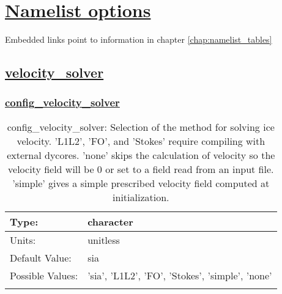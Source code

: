 \chapter[Namelist options]{\hyperref[chap:namelist_tables]{Namelist options}}
\label{chap:namelist_sections}
Embedded links point to information in chapter \ref{chap:namelist_tables}
\section[velocity\_solver]{\hyperref[sec:nm_tab_velocity_solver]{velocity\_solver}}
\label{sec:nm_sec_velocity_solver}
\subsection[config\_velocity\_solver]{\hyperref[sec:nm_tab_velocity_solver]{config\_velocity\_solver}}
\label{subsec:nm_sec_config_velocity_solver}
\begin{center}
\begin{longtable}{| p{2.0in} || p{4.0in} |}
    \hline
    Type: & character \\
    \hline
    Units: & \si{unitless} \\
    \hline
    Default Value: & sia \\
    \hline
    Possible Values: & 'sia', 'L1L2', 'FO', 'Stokes', 'simple', 'none' \\
    \hline
    \caption{config\_velocity\_solver: Selection of the method for solving ice velocity. 'L1L2', 'FO', and 'Stokes' require compiling with external dycores. 'none' skips the calculation of velocity so the velocity field will be 0 or set to a field read from an input file.  'simple' gives a simple prescribed velocity field computed at initialization.}
\end{longtable}
\end{center}

